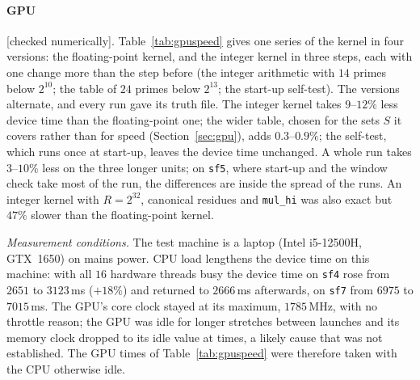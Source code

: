 \documentclass[10pt,a4paper]{article}
\newcommand{\code}[1]{\texttt{#1}}
\newcommand{\stnum}{\textsf{\small[checked numerically]}\xspace}
\theoremstyle{plain}
\theoremstyle{definition}
\begin{document}
\paragraph{GPU} \stnum.  Table~\ref{tab:gpuspeed} gives one series of the kernel in four versions: the floating-point kernel, and the integer kernel in three
steps, each with one change more than the step before (the integer arithmetic with $14$ primes below $2^{10}$; the table of $24$ primes below $2^{13}$; the start-up
self-test).  The versions alternate, and every run gave its truth file.  The integer kernel takes $9$--$12\%$ less device time than the floating-point one; the wider
table, chosen for the sets $S$ it covers rather than for speed (Section~\ref{sec:gpu}), adds $0.3$--$0.9\%$; the self-test, which runs once at start-up, leaves the device time unchanged.  A whole run takes $3$--$10\%$ less on the three longer
units; on \code{sf5}, where start-up and the window check take most of the run, the differences are inside the spread of the runs.  An integer kernel with
$R=2^{32}$, canonical residues and \code{mul\_hi} was also exact but $47\%$ slower than the floating-point kernel.

\emph{Measurement conditions.}  The test machine is a laptop (Intel i5-12500H, GTX~1650) on mains power.  CPU load lengthens the device time on this machine:
with all $16$ hardware threads busy the device time on \code{sf4} rose from $2651$ to $3123$\,ms ($+18\%$) and returned to $2666$\,ms afterwards, on \code{sf7}
from $6975$ to $7015$\,ms.  The GPU's core clock stayed at its maximum, $1785$\,MHz, with no throttle reason; the GPU was idle for longer stretches between
launches and its memory clock dropped to its idle value at times, a likely cause that was not established.  The GPU times of Table~\ref{tab:gpuspeed} were
therefore taken with the CPU otherwise idle.
\end{document}
